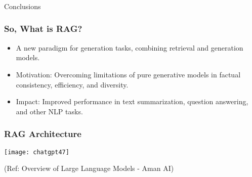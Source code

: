 \begin{frame}[fragile]\frametitle{}
\begin{center}
{\Large Conclusions}
\end{center}
\end{frame}

\begin{frame}[fragile]\frametitle{So, What is RAG?}

\begin{itemize}
\item A new paradigm for generation tasks, combining retrieval and generation models.
\item Motivation: Overcoming limitations of pure generative models in factual consistency, efficiency, and diversity.
\item Impact: Improved performance in text summarization, question answering, and other NLP tasks.
\end{itemize}	

\end{frame}


\begin{frame}[fragile]\frametitle{RAG Architecture}


		\begin{center}
		\texttt{[image: chatgpt47]}
		\end{center}

{\tiny (Ref: Overview of Large Language Models - Aman AI)}

\end{frame}



